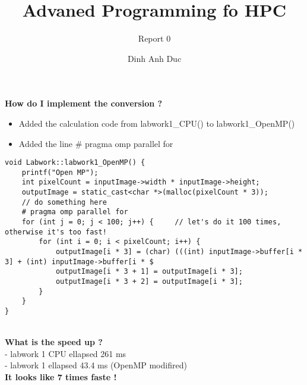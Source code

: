 \documentclass[10pt, a4paper]{article}
\title{Advaned Programming fo HPC}
\subtitle{Report 0}
\author{Dinh Anh Duc}
\begin{document}
\maketitle

\textbf{How do I implement the conversion ?}
\\
\begin{itemize}
\item Added the calculation code from labwork1_CPU() to labwork1_OpenMP()
\item Added the line # pragma omp parallel for 
\end{itemize}
\begin{verbatim}
void Labwork::labwork1_OpenMP() {
    printf("Open MP");
    int pixelCount = inputImage->width * inputImage->height;
    outputImage = static_cast<char *>(malloc(pixelCount * 3));
    // do something here
    # pragma omp parallel for
    for (int j = 0; j < 100; j++) {     // let's do it 100 times, otherwise it's too fast!
        for (int i = 0; i < pixelCount; i++) {
            outputImage[i * 3] = (char) (((int) inputImage->buffer[i * 3] + (int) inputImage->buffer[i * $
            outputImage[i * 3 + 1] = outputImage[i * 3];
            outputImage[i * 3 + 2] = outputImage[i * 3];
        }
    }
}
\end{verbatim}
\\
\textbf{What is the speed up ?}
\\
- labwork 1 CPU ellapsed 261 ms
\\
- labwork 1 ellapsed 43.4 ms (OpenMP modifired)
\\
\textbf{It looks like 7 times faste !} 
\end{document}
